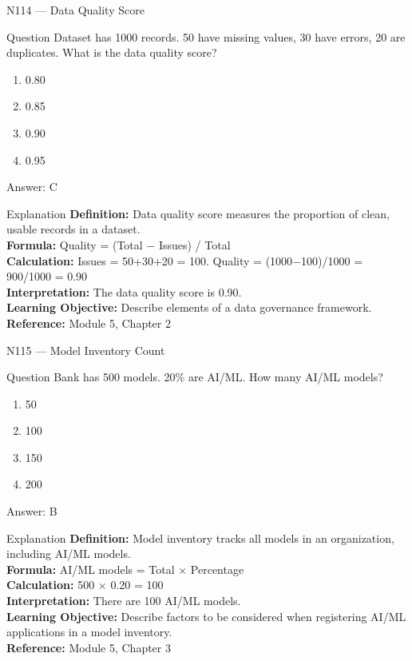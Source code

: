 \documentclass[aspectratio=169,8pt]{beamer}
\begin{document}
	\begin{frame}{N114 --- Data Quality Score}
		\begin{block}{Question}
			Dataset has 1000 records. 50 have missing values, 30 have errors, 20 are duplicates. What is the data quality score?
			\begin{enumerate}
				\item 0.80
				\item 0.85
				\item 0.90
				\item 0.95
			\end{enumerate}
		\end{block}
		\begin{exampleblock}{Answer: C}\end{exampleblock}
		\begin{block}{Explanation}
			\textbf{Definition:} Data quality score measures the proportion of clean, usable records in a dataset.\\
			\textbf{Formula:} Quality = (Total $-$ Issues) / Total\\
			\textbf{Calculation:} Issues = 50+30+20 = 100. Quality = (1000$-$100)/1000 = 900/1000 = 0.90\\
			\textbf{Interpretation:} The data quality score is 0.90.\\
			\textbf{Learning Objective:} Describe elements of a data governance framework.\\
			\textbf{Reference:} Module 5, Chapter 2
		\end{block}
	\end{frame}
	
	\begin{frame}{N115 --- Model Inventory Count}
		\begin{block}{Question}
			Bank has 500 models. 20\% are AI/ML. How many AI/ML models?
			\begin{enumerate}
				\item 50
				\item 100
				\item 150
				\item 200
			\end{enumerate}
		\end{block}
		\begin{exampleblock}{Answer: B}\end{exampleblock}
		\begin{block}{Explanation}
			\textbf{Definition:} Model inventory tracks all models in an organization, including AI/ML models.\\
			\textbf{Formula:} AI/ML models = Total $\times$ Percentage\\
			\textbf{Calculation:} 500 $\times$ 0.20 = 100\\
			\textbf{Interpretation:} There are 100 AI/ML models.\\
			\textbf{Learning Objective:} Describe factors to be considered when registering AI/ML applications in a model inventory.\\
			\textbf{Reference:} Module 5, Chapter 3
		\end{block}
	\end{frame}
	
\end{document}
